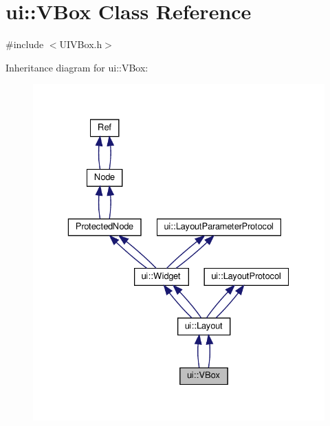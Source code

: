 \hypertarget{classui_1_1VBox}{}\section{ui\+:\+:V\+Box Class Reference}
\label{classui_1_1VBox}


{\ttfamily \#include $<$U\+I\+V\+Box.\+h$>$}



Inheritance diagram for ui\+:\+:V\+Box\+:
\nopagebreak
\begin{figure}[H]
\begin{center}
\leavevmode
\includegraphics[width=329pt]{classui_1_1VBox__inherit__graph}
\end{center}
\end{figure}


